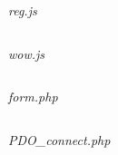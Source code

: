 \textit{reg.js}

\inputminted[fontsize=\footnotesize, linenos]{javascript}{final/command_tour/ar/task_02/reg.js}

\textit{wow.js}

\inputminted[fontsize=\footnotesize, linenos]{javascript}{final/command_tour/ar/task_02/wow.js}

\textit{form.php}

\inputminted[fontsize=\footnotesize, linenos]{php}{final/command_tour/ar/task_02/form.php}

\textit{PDO\_connect.php}

\inputminted[fontsize=\footnotesize, linenos]{php}{final/command_tour/ar/task_02/PDO_connect.php}